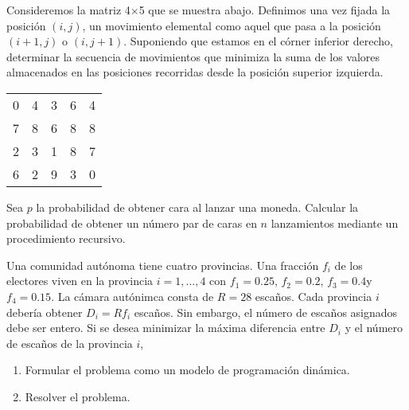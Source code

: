 \documentclass[twoside]{article}
\begin{document}
\newpage
\begin{ejercicio}{8} 
Consideremos la matriz 4$\times$5 que se muestra abajo. Definimos una vez fijada la posición $(i, j)$,
un movimiento elemental como aquel que pasa a la posición $(i + 1, j)$ o $(i, j + 1)$. Suponiendo
que estamos en el córner inferior derecho, determinar la secuencia de movimientos que minimiza la
suma de los valores almacenados en las posiciones recorridas desde la posición superior izquierda.
\begin{center}
\begin{tabular}{c c c c c}
0 & 4 & 3 & 6 & 4\\
7 & 8 & 6 & 8 & 8\\
2 & 3 & 1 & 8 & 7\\
6 & 2 & 9 & 3 & 0
\end{tabular}
\end{center}
\end{ejercicio}
\begin{solucion}

\end{solucion}

\newpage

\begin{ejercicio}{9}
Sea $p$ la probabilidad de obtener cara al lanzar una moneda. Calcular la probabilidad de
obtener un número par de caras en $n$ lanzamientos mediante un procedimiento recursivo.
\end{ejercicio}
\begin{solucion}
\end{solucion}

\newpage

\begin{ejercicio}{10}
Una comunidad autónoma tiene cuatro provincias. Una fracción $f_i$ de los electores viven en
la provincia $i = 1,\dots,4$ con $f_1 = 0.25$, $f_2 = 0.2$, $f_3 = 0.4 $y $f_4 = 0.15$. La cámara autónimca consta
de $R = 28$ escaños. Cada provincia $i$ debería obtener $D_i = Rf_i$ escaños. Sin embargo, el número
de escaños asignados debe ser entero. Si se desea minimizar la máxima diferencia entre $D_i$ y el
número de escaños de la provincia $i$,
\begin{enumerate}
\item Formular el problema como un modelo de programación dinámica.
\item Resolver el problema.
\end{enumerate}
\end{ejercicio}
\begin{solucion}
\end{solucion}
\end{document}
